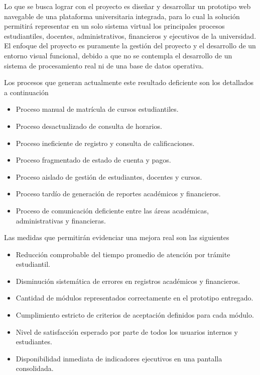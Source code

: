 \documentclass[11pt,spanish]{article}
\begin{document}
Lo que se busca lograr con el proyecto es diseñar y desarrollar un prototipo web navegable de una plataforma universitaria integrada, para lo cual la solución permitirá representar en un solo sistema virtual los principales procesos estudiantiles, docentes, administrativos, financieros y ejecutivos de la universidad. El enfoque del proyecto es puramente la gestión del proyecto y el desarrollo de un entorno visual funcional, debido a que no se contempla el desarrollo de un sistema de procesamiento real ni de una base de datos operativa.

Los procesos que generan actualmente este resultado deficiente son los detallados a continuación

\begin{itemize}
    \item Proceso manual de matrícula de cursos estudiantiles.
    \item Proceso desactualizado de consulta de horarios.
    \item Proceso ineficiente de registro y consulta de calificaciones.
    \item Proceso fragmentado de estado de cuenta y pagos.
    \item Proceso aislado de gestión de estudiantes, docentes y cursos.
    \item Proceso tardío de generación de reportes académicos y financieros.
    \item Proceso de comunicación deficiente entre las áreas académicas, administrativas y financieras.
\end{itemize}

Las medidas que permitirán evidenciar una mejora real son las siguientes

\begin{itemize}
    \item Reducción comprobable del tiempo promedio de atención por trámite estudiantil.
    \item Disminución sistemática de errores en registros académicos y financieros.
    \item Cantidad de módulos representados correctamente en el prototipo entregado.
    \item Cumplimiento estricto de criterios de aceptación definidos para cada módulo.
    \item Nivel de satisfacción esperado por parte de todos los usuarios internos y estudiantes.
    \item Disponibilidad inmediata de indicadores ejecutivos en una pantalla consolidada.
\end{itemize}
\end{document}
